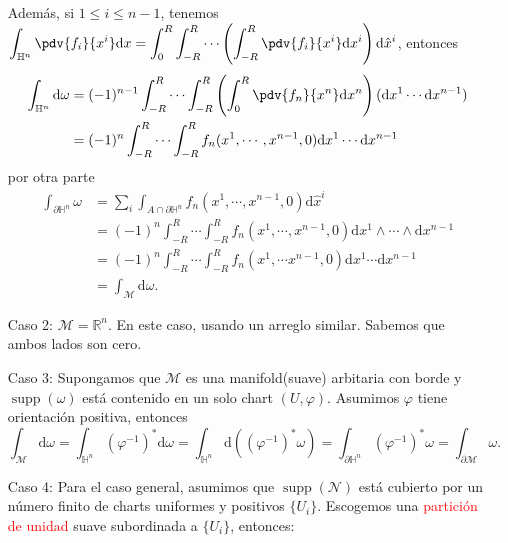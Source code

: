 \documentclass[../main]{subfiles}
\begin{document}
\begin{adjustwidth}{0pt}{-100pt}
\begin{enumerate}[itemindent=1cm]
    Además, si $1\leq i \leq n-1$, tenemos $\displaystyle \int_{\mathbb{H}^n} \pdv{f_i}{x^{i}}\mathrm{d}x=\int_0^{R} \int_{-R}^R \cdots \left(\int_{-R}^R \pdv{f_i}{x^{i}}\mathrm{d}x^{i}\right)\mathrm{d}\hat{x}^{i}$, entonces 
    \begin{equation}
        \begin{split}
            \int_{\mathbb{H}^n} \mathrm{d}\omega&=(-1)^{n-1} \int_{-R}^R \cdots \int_{-R}^R \left(\int_0^R \pdv{f_n}{x^n}\mathrm{d}x^n\right)(\mathrm{d}x^1 \cdots \mathrm{d}x^{n-1})\\
            &=(-1)^n \int_{-R}^R \cdots \int_{-R}^R f_n(x^1, \cdots, x^{n-1}, 0)\mathrm{d}x^1 \cdots \mathrm{d}x^{n-1}
        \end{split}
    \end{equation}
    por otra parte 
    \begin{equation}
        \begin{split}
            \int_{\partial \mathbb{H}^n} \omega&= \sum_i \int_{A \cap \partial \mathbb{H}^n} f_n(x^1, \cdots, x^{n-1}, 0)\mathrm{d}\hat{x}^{i} \\
            &=(-1)^n \int_{-R}^R \cdots \int_{-R}^R f_n(x^1, \cdots, x^{n-1}, 0)\mathrm{d}x^1 \wedge \cdots \wedge \mathrm{d}x^{n-1}\\
            &=(-1)^n \int_{-R}^R \cdots \int_{-R}^R f_n(x^1, \cdots x^{n-1}, 0) \mathrm{d}x^1 \cdots \mathrm{d}x^{n-1}\\
            &=\int_{\mathcal{M}} \mathrm{d}\omega.
        \end{split}
    \end{equation}
    \item[Caso 2:] $\mathcal{M}=\mathbb{R}^n$. En este caso, usando un arreglo similar. Sabemos que ambos lados son cero.
    \item[Caso 3:] Supongamos que $\mathcal{M}$ es una manifold(suave) arbitaria con borde y $\operatorname{supp}(\omega)$ está contenido en un solo chart $(U, \varphi)$. Asumimos $\varphi$ tiene orientación positiva, entonces
    \begin{equation}
        \int_{\mathcal{M}} \mathrm{d}\omega = \int_{\mathbb{H}^n} (\varphi^{-1})^* \mathrm{d}\omega=\int_{\mathbb{H}^n} \mathrm{d}((\varphi^{-1})^* \omega)=\int_{\partial \mathbb{H}^n} (\varphi^{-1})^* \omega=\int_{\partial \mathcal{M}} \omega.
    \end{equation}
    \item[Caso 4:] Para el caso general, asumimos que $\operatorname{supp} (\mathcal{N})$ está cubierto por un número finito de charts uniformes y positivos $\{ U_i\}$. Escogemos una \textcolor{red}{partición de unidad} suave subordinada a $\{U_i\}$, entonces:

\end{enumerate}
\end{adjustwidth}
\end{document}
